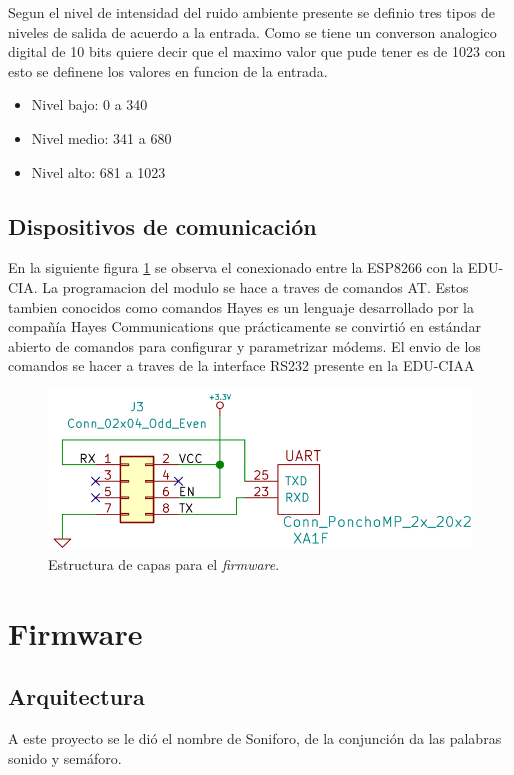 Segun el nivel de  intensidad del ruido ambiente presente se definio tres tipos de niveles de salida de acuerdo a la entrada. Como se tiene un converson analogico digital de 10 bits quiere decir que el maximo valor  que pude tener es de 1023 con esto se definene los valores en funcion de la entrada.

\begin{itemize}
\item Nivel bajo: 0 a 340
\item Nivel medio: 341 a 680
\item Nivel alto: 681 a 1023
\end{itemize}

\subsection{Dispositivos de comunicación}

En la siguiente figura \ref{fig:conexionESP} se observa el conexionado entre la ESP8266 con la EDU-CIA. La programacion del modulo se hace a traves de comandos AT. Estos tambien conocidos como comandos Hayes es un lenguaje desarrollado por la compañía Hayes Communications que prácticamente se convirtió en estándar abierto de comandos para configurar y parametrizar módems. El envio de los comandos se hacer a traves de la interface RS232 presente en la EDU-CIAA

\begin{figure}[h]
	\centering
	\includegraphics[scale=.5]{./Figures/conexionESP.png}
	\caption{Estructura de capas para el \textit{firmware}.}
	\label{fig:conexionESP}
\end{figure}

\section{Firmware}
\subsection{Arquitectura}
A este proyecto se le dió el nombre de Soniforo, de la conjunción da las palabras sonido y semáforo.

